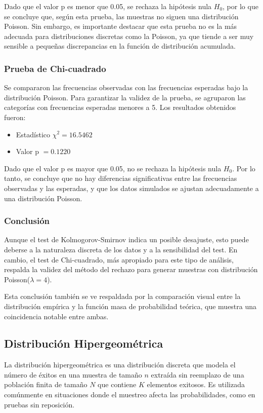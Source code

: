 \documentclass{article}
\begin{document}
Dado que el valor p es menor que 0.05, se rechaza la hipótesis nula \(H_0\), por lo que se concluye que, según esta prueba, las muestras no siguen una distribución Poisson. Sin embargo, es importante destacar que esta prueba no es la más adecuada para distribuciones discretas como la Poisson, ya que tiende a ser muy sensible a pequeñas discrepancias en la función de distribución acumulada.

\subsubsection{Prueba de Chi-cuadrado}

Se compararon las frecuencias observadas con las frecuencias esperadas bajo la distribución Poisson. Para garantizar la validez de la prueba, se agruparon las categorías con frecuencias esperadas menores a 5. Los resultados obtenidos fueron:

\begin{itemize}
    \item Estadístico \(\chi^2 = 16.5462\)
    \item Valor p \(= 0.1220\)
\end{itemize}

Dado que el valor p es mayor que 0.05, no se rechaza la hipótesis nula \(H_0\). Por lo tanto, se concluye que no hay diferencias significativas entre las frecuencias observadas y las esperadas, y que los datos simulados se ajustan adecuadamente a una distribución Poisson.

\subsubsection{Conclusión}

Aunque el test de Kolmogorov-Smirnov indica un posible desajuste, esto puede deberse a la naturaleza discreta de los datos y a la sensibilidad del test. En cambio, el test de Chi-cuadrado, más apropiado para este tipo de análisis, respalda la validez del método del rechazo para generar muestras con distribución Poisson(\(\lambda = 4\)).

Esta conclusión también se ve respaldada por la comparación visual entre la distribución empírica y la función masa de probabilidad teórica, que muestra una coincidencia notable entre ambas.





\subsection{Distribución Hipergeométrica}
La distribución hipergeométrica es una distribución discreta que modela el número de éxitos en una muestra de tamaño $n$ extraída sin reemplazo de una población finita de tamaño $N$ que contiene $K$ elementos exitosos. Es utilizada comúnmente en situaciones donde el muestreo afecta las probabilidades, como en pruebas sin reposición.
\end{document}
